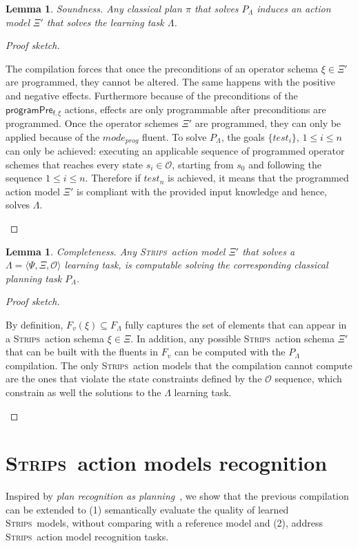 \documentclass{article}
\newcommand{\tup}[1]{{\langle #1 \rangle}}
\newcommand{\strips}{\textsc{Strips}}     %
\newtheorem{lemma}[theorem]{Lemma}
\begin{document}
\begin{lemma}
Soundness. Any classical plan $\pi$ that solves $P_{\Lambda}$ induces an action model $\Xi'$ that solves the learning task $\Lambda$.
\end{lemma}

\begin{proof}[Proof sketch]
\begin{small}
The compilation forces that once the preconditions of an operator schema $\xi \in \Xi'$ are programmed, they cannot be altered. The same happens with the positive and negative effects. Furthermore because of the preconditions of the $\mathsf{programPre_{f,\xi}}$ actions, effects are only programmable after preconditions are programmed. Once the operator schemes $\Xi'$ are programmed, they can only be applied because of the $mode_{prog}$ fluent. To solve $P_{\Lambda}$, the goals $\{test_i\}$, {\small $1\leq i\leq n$} can only be achieved: executing an applicable sequence of programmed operator schemes that reaches every state $s_i\in\mathcal{O}$, starting from $s_0$ and following  the sequence {\small $1\leq i\leq n$}. Therefore if $test_n$ is achieved, it means that the programmed action model $\Xi'$ is compliant with the provided input knowledge and hence, solves $\Lambda$.
\end{small}
\end{proof}


\begin{lemma}
Completeness. Any \strips\ action model $\Xi'$ that solves a $\Lambda=\tup{\Psi,\Xi,\mathcal{O}}$ learning task, is computable solving the corresponding classical planning task $P_{\Lambda}$.
\end{lemma}

\begin{proof}[Proof sketch]
\begin{small}
By definition, $F_v(\xi)\subseteq F_\Lambda$ fully captures the set of elements that can appear in a \strips\ action schema $\xi\in\Xi$. In addition, any possible \strips\ action schema $\Xi'$ that can be built with the fluents in $F_v$ can be computed  with the $P_{\Lambda}$ compilation. The only \strips\ action models that the compilation cannot compute are the ones that violate the state constraints defined by the $\mathcal{O}$ sequence, which constrain as well the solutions to the $\Lambda$ learning task.
\end{small}
\end{proof}


\section{\strips\ action models recognition}
Inspired by {\em plan recognition as planning}~\cite{ramirez2009plan}, we show that the previous compilation can be extended to (1) semantically evaluate the quality of learned \strips\ models, without comparing with a reference model and (2), address \strips\ action model recognition tasks.
\end{document}
